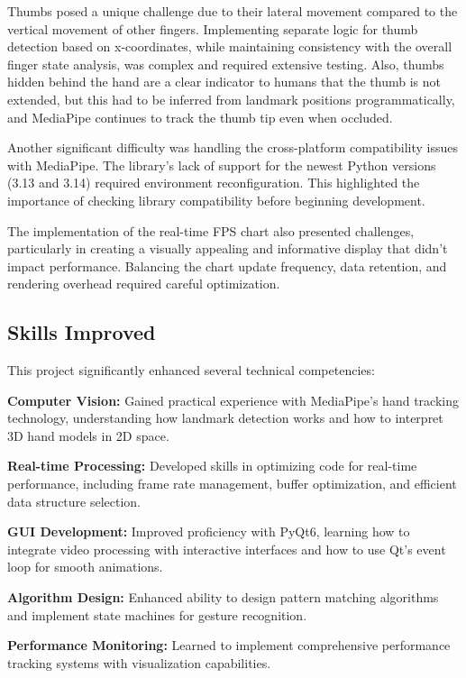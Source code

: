 \documentclass{article}
\begin{document}
Thumbs posed a unique challenge due to their lateral movement compared to the vertical movement of other fingers. Implementing separate logic for thumb detection based on x-coordinates, while maintaining consistency with the overall finger state analysis, was complex and required extensive testing. Also, thumbs hidden behind the hand are a clear indicator to humans that the thumb is not extended, but this had to be inferred from landmark positions programmatically, and MediaPipe continues to track the thumb tip even when occluded.

Another significant difficulty was handling the cross-platform compatibility issues with MediaPipe. The library's lack of support for the newest Python versions (3.13 and 3.14) required environment reconfiguration. This highlighted the importance of checking library compatibility before beginning development.

The implementation of the real-time FPS chart also presented challenges, particularly in creating a visually appealing and informative display that didn't impact performance. Balancing the chart update frequency, data retention, and rendering overhead required careful optimization.

\subsection{Skills Improved}

This project significantly enhanced several technical competencies:

\textbf{Computer Vision:} Gained practical experience with MediaPipe's hand tracking technology, understanding how landmark detection works and how to interpret 3D hand models in 2D space.

\textbf{Real-time Processing:} Developed skills in optimizing code for real-time performance, including frame rate management, buffer optimization, and efficient data structure selection.

\textbf{GUI Development:} Improved proficiency with PyQt6, learning how to integrate video processing with interactive interfaces and how to use Qt's event loop for smooth animations.

\textbf{Algorithm Design:} Enhanced ability to design pattern matching algorithms and implement state machines for gesture recognition.

\textbf{Performance Monitoring:} Learned to implement comprehensive performance tracking systems with visualization capabilities.
\end{document}
